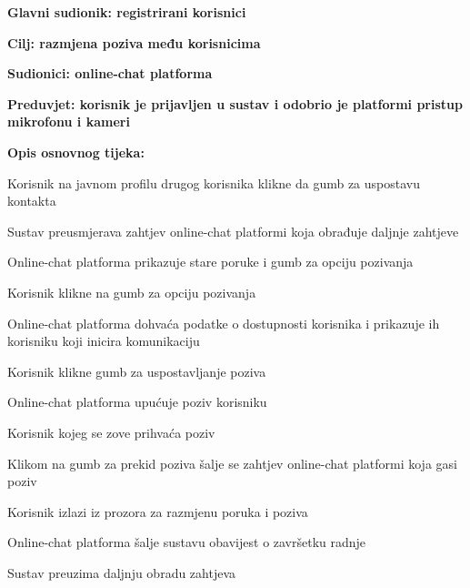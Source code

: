 					\noindent {}
					\begin{packed_item}
						\item \textbf{Glavni sudionik: registrirani korisnici}
						\item  \textbf{Cilj: razmjena poziva među korisnicima}
						\item  \textbf{Sudionici: online-chat platforma}
						\item  \textbf{Preduvjet: korisnik je prijavljen u sustav i odobrio je platformi pristup mikrofonu i kameri}
						
						\item  \textbf{Opis osnovnog tijeka:}
						\item[] \begin{packed_enum}
							\item Korisnik na javnom profilu drugog korisnika klikne da gumb za uspostavu kontakta
							\item Sustav preusmjerava zahtjev online-chat platformi koja obrađuje daljnje zahtjeve
							\item Online-chat platforma prikazuje stare poruke i gumb za opciju pozivanja
							\item Korisnik klikne na gumb za opciju pozivanja
							\item Online-chat platforma dohvaća podatke o dostupnosti korisnika i prikazuje ih korisniku koji inicira komunikaciju
							\item Korisnik klikne gumb za uspostavljanje poziva
							\item Online-chat platforma upućuje poziv korisniku
							\item Korisnik kojeg se zove prihvaća poziv
							\item Klikom na gumb za prekid poziva šalje se zahtjev online-chat platformi koja gasi poziv
							\item Korisnik izlazi iz prozora za razmjenu poruka i poziva
							\item Online-chat platforma šalje sustavu obavijest o završetku radnje
							\item Sustav preuzima daljnju obradu zahtjeva
						\end{packed_enum}
						

\end{packed_item}
